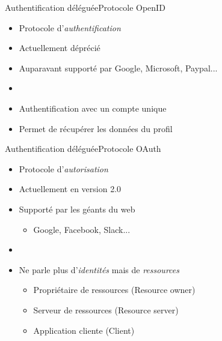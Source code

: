 \documentclass{beamer}
\begin{document}
\begin{frame}{Authentification déléguée}{Protocole OpenID}
  \begin{center}
    \begin{itemize}
      \item Protocole d'\emph{authentification}
      \item Actuellement déprécié
      \item Auparavant supporté par Google, Microsoft, Paypal...
      \item[~]
      \item Authentification avec un compte unique
      \item Permet de récupérer les données du profil
    \end{itemize}
  \end{center}
\end{frame}

\begin{frame}{Authentification déléguée}{Protocole OAuth}
  \begin{center}
    \begin{itemize}
      \item Protocole d'\emph{autorisation}
      \item Actuellement en version 2.0
      \item Supporté par les géants du web
      \begin{itemize}
        \item Google, Facebook, Slack...
      \end{itemize}
      \item[~]
      \item Ne parle plus d'\emph{identités} mais de \emph{ressources}
        \begin{itemize}
          \item Propriétaire de ressources (Resource owner)
          \item Serveur de ressources (Resource server)
          \item Application cliente (Client)
        \end{itemize}
    \end{itemize}
  \end{center}
\end{frame}
\end{document}
